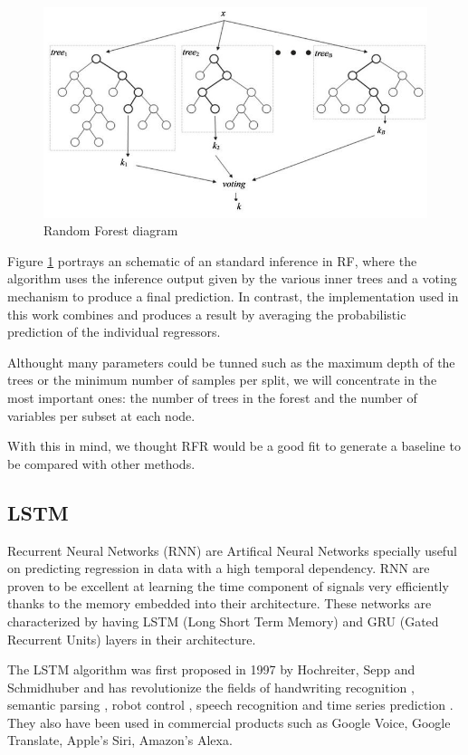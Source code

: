 \documentclass[anon]{CI}
\begin{document}
\begin{figure}[ht!]
   \center
   \includegraphics[width=\linewidth]{RF-architecture.jpeg}
   \caption{\label{fig:RF}Random Forest diagram}
\end{figure}

Figure \ref{fig:RF} portrays an schematic of an standard inference in RF, where the algorithm uses the inference output given by the various inner trees and a voting mechanism to produce a final prediction. In contrast, the implementation used in this work combines and produces a result by averaging the probabilistic prediction of the individual regressors.

Althought many parameters could be tunned such as the maximum depth of the trees or the minimum number of samples per split, we will concentrate in the most important ones: the number of trees in the forest and the number of variables per subset at each node.

With this in mind, we thought RFR would be a good fit to generate a baseline to be compared with other methods.

\subsection{LSTM}

Recurrent Neural Networks (RNN) are Artifical Neural Networks specially useful on predicting regression in data with a high temporal dependency. RNN are proven to be excellent at learning the time component of signals very efficiently thanks to the memory embedded into their architecture. These networks are characterized by having LSTM (Long Short Term Memory) and GRU (Gated Recurrent Units) layers in their architecture.

The LSTM algorithm was first proposed in 1997 by Hochreiter, Sepp and Schmidhuber \cite{hochreiter1997long} and has revolutionize the fields of handwriting recognition \cite{graves2008offline}, semantic parsing \cite{jia2016data}, robot control \cite{mayer2008system}, speech recognition \cite{graves2005framewise} and time series prediction \cite{schmidhuber2005evolino}. They also have been used in commercial products such as Google Voice, Google Translate, Apple's Siri, Amazon's Alexa.
\end{document}
